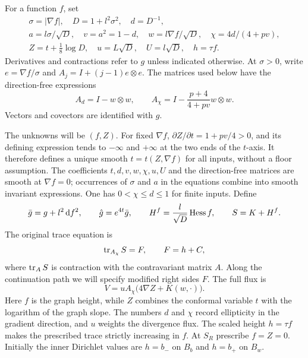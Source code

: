 For a function $f$, set
\begin{equation}\label{n3:deformation:basic-variables}
 \begin{gathered}
 \sigma=|\nabla f|,\quad D=1+l^2\sigma^2,\quad d=D^{-1},\\
 a=l\sigma/\sqrt D,\quad v=a^2=1-d,\quad
 w=l\nabla f/\sqrt D,\quad \chi=4d/(4+pv),\\
 Z=t+\tfrac18\log D,\quad u=L\sqrt D,\quad U=l\sqrt D,\quad h=\tau f.
 \end{gathered}
\end{equation}
Derivatives and contractions refer to $g$ unless indicated otherwise.
At $\sigma>0$, write $e=\nabla f/\sigma$ and
$A_j=I+(j-1)e\otimes e$. The matrices used below have the direction-free
expressions
\begin{equation}\label{n3:deformation:axial-matrices}
 A_d=I-w\otimes w,\qquad
 A_\chi=I-\frac{p+4}{4+pv}w\otimes w.
\end{equation}
Vectors and covectors are identified with $g$.

The unknowns will be $(f,Z)$. For fixed $\nabla f$,
$\partial Z/\partial t=1+pv/4>0$, and its defining expression tends to
$-\infty$ and $+\infty$ at the two ends of the $t$-axis. It therefore
defines a unique smooth $t=t(Z,\nabla f)$ for all inputs, without a floor
assumption. The coefficients $t,d,v,w,\chi,u,U$ and the direction-free
matrices are smooth at $\nabla f=0$; occurrences of $\sigma$ and $a$
in the equations combine into smooth invariant expressions. One has
$0<\chi\le d\le1$ for finite inputs.
Define
\begin{equation}\label{n3:deformation:metrics}
 \bar g=g+l^2\,\mathrm d f^2,\qquad \hat g=e^{4t}\bar g,\qquad
 H^f=\frac l{\sqrt D}\operatorname{Hess} f,\qquad S=K+H^f.
\end{equation}
The original trace equation is
\begin{equation}\label{n3:deformation:trace}
 \operatorname{tr}_{A_\chi}S=F,\qquad F=h+C,
\end{equation}
where $\operatorname{tr}_A S$ is contraction with the contravariant matrix $A$.
Along the continuation path we will specify modified right sides $F$.
The full flux is
\begin{equation}\label{n3:deformation:flux}
 V=uA_\chi\bigl(4\nabla Z+K(w,\cdot)\bigr).
\end{equation}
Here $f$ is the graph height, while $Z$ combines the conformal
variable $t$ with the logarithm of the graph slope. The numbers $d$
and $\chi$ record ellipticity in the gradient direction, and $u$
weights the divergence flux. The scaled height $h=\tau f$ makes the
prescribed trace strictly increasing in $f$.
At $S_R$ prescribe $f=Z=0$. Initially the inner Dirichlet values are
$h=b_-$ on $B_b$ and $h=b_+$ on $B_w$.

